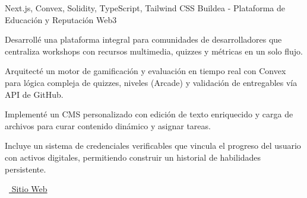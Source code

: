 \begin{cventries}
  \vspace{6mm}
  \cventry
    {Next.js, Convex, Solidity, TypeScript, Tailwind CSS} %
    {Buildea - Plataforma de Educación y Reputación Web3} %
    {} %
    {} %
    {
      \begin{cvitems} %
        \item {Desarrollé una plataforma integral para comunidades de desarrolladores que centraliza workshops con recursos multimedia, quizzes y métricas en un solo flujo.}
        \item {Arquitecté un motor de gamificación y evaluación en tiempo real con Convex para lógica compleja de quizzes, niveles (Arcade) y validación de entregables vía API de GitHub.}
        \item {Implementé un CMS personalizado con edición de texto enriquecido y carga de archivos para curar contenido dinámico y asignar tareas.}
        \item {Incluye un sistema de credenciales verificables que vincula el progreso del usuario con activos digitales, permitiendo construir un historial de habilidades persistente.}
        \item {\faLink\ \href{https://app.buildea.dev/}{ Sitio Web}}
      \end{cvitems}
    }

\end{cventries}
